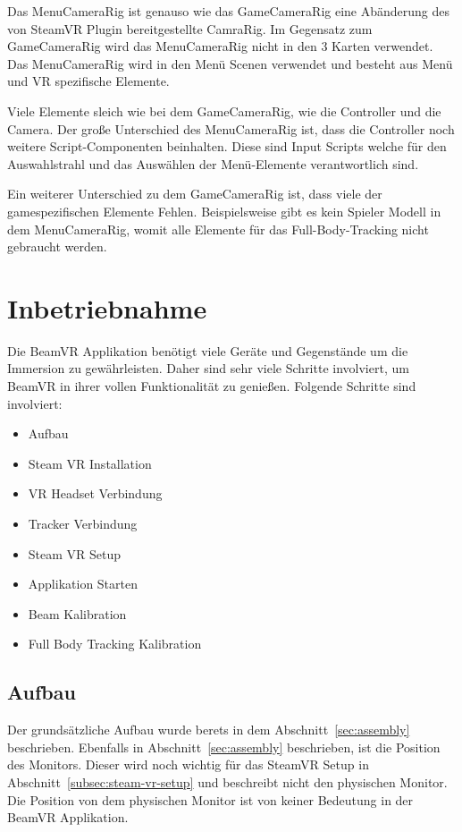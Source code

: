 Das MenuCameraRig ist genauso wie das GameCameraRig eine Abänderung des von SteamVR Plugin bereitgestellte CamraRig.
Im Gegensatz zum GameCameraRig wird das MenuCameraRig nicht in den 3 Karten verwendet.
Das MenuCameraRig wird in den Menü Scenen verwendet und besteht aus Menü und VR spezifische Elemente.

Viele Elemente sleich wie bei dem GameCameraRig, wie die Controller und die Camera.
Der große Unterschied des MenuCameraRig ist, dass die Controller noch weitere Script-Componenten beinhalten.
Diese sind Input Scripts welche für den Auswahlstrahl und das Auswählen der Menü-Elemente verantwortlich sind.


Ein weiterer Unterschied zu dem GameCameraRig ist, dass viele der gamespezifischen Elemente Fehlen.
Beispielsweise gibt es kein Spieler Modell in dem MenuCameraRig, womit alle Elemente für das Full-Body-Tracking nicht gebraucht werden.

\section{Inbetriebnahme}\label{sec:commissioning}

Die BeamVR Applikation benötigt viele Geräte und Gegenstände um die Immersion zu gewährleisten.
Daher sind sehr viele Schritte involviert, um BeamVR in ihrer vollen Funktionalität zu genießen.
Folgende Schritte sind involviert:

\begin{itemize}
    \item Aufbau
    \item Steam VR Installation
    \item VR Headset Verbindung
    \item Tracker Verbindung
    \item Steam VR Setup
    \item Applikation Starten
    \item Beam Kalibration
    \item Full Body Tracking Kalibration
\end{itemize}


\subsection{Aufbau}

Der grundsätzliche Aufbau wurde berets in dem Abschnitt~\ref{sec:assembly} beschrieben.
Ebenfalls in Abschnitt~\ref{sec:assembly} beschrieben, ist die Position des Monitors.
Dieser wird noch wichtig für das SteamVR Setup in Abschnitt~\ref{subsec:steam-vr-setup} und beschreibt nicht den physischen Monitor.
Die Position von dem physischen Monitor ist von keiner Bedeutung in der BeamVR Applikation.

